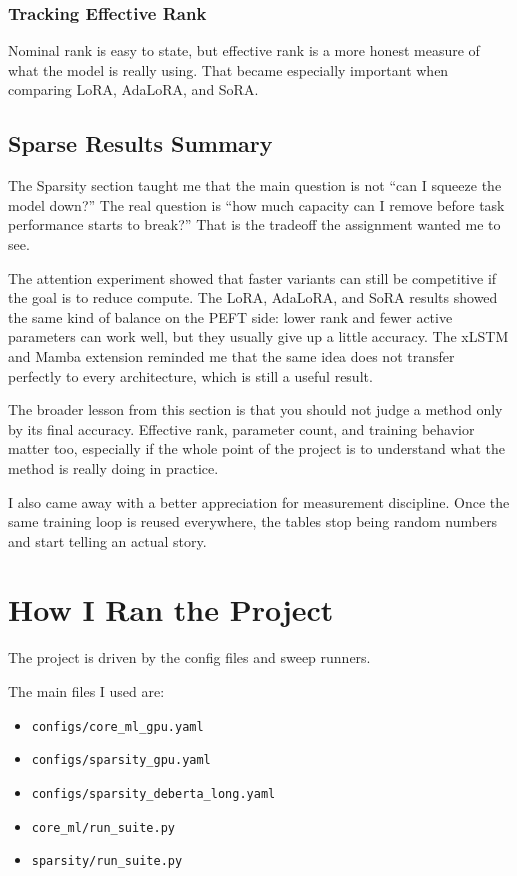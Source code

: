 \documentclass[11pt]{article}
\begin{document}
\subsubsection{Tracking Effective Rank}
Nominal rank is easy to state, but effective rank is a more honest measure of what the model is really using. That became especially important when comparing LoRA, AdaLoRA, and SoRA.

\subsection{Sparse Results Summary}
The Sparsity section taught me that the main question is not ``can I squeeze the model down?'' The real question is ``how much capacity can I remove before task performance starts to break?'' That is the tradeoff the assignment wanted me to see.

The attention experiment showed that faster variants can still be competitive if the goal is to reduce compute. The LoRA, AdaLoRA, and SoRA results showed the same kind of balance on the PEFT side: lower rank and fewer active parameters can work well, but they usually give up a little accuracy. The xLSTM and Mamba extension reminded me that the same idea does not transfer perfectly to every architecture, which is still a useful result.

The broader lesson from this section is that you should not judge a method only by its final accuracy. Effective rank, parameter count, and training behavior matter too, especially if the whole point of the project is to understand what the method is really doing in practice.

I also came away with a better appreciation for measurement discipline. Once the same training loop is reused everywhere, the tables stop being random numbers and start telling an actual story.

\section{How I Ran the Project}
The project is driven by the config files and sweep runners.

The main files I used are:
\begin{itemize}[leftmargin=*]
  \item \texttt{configs/core\_ml\_gpu.yaml}
  \item \texttt{configs/sparsity\_gpu.yaml}
  \item \texttt{configs/sparsity\_deberta\_long.yaml}
  \item \texttt{core\_ml/run\_suite.py}
  \item \texttt{sparsity/run\_suite.py}
\end{itemize}
\end{document}
